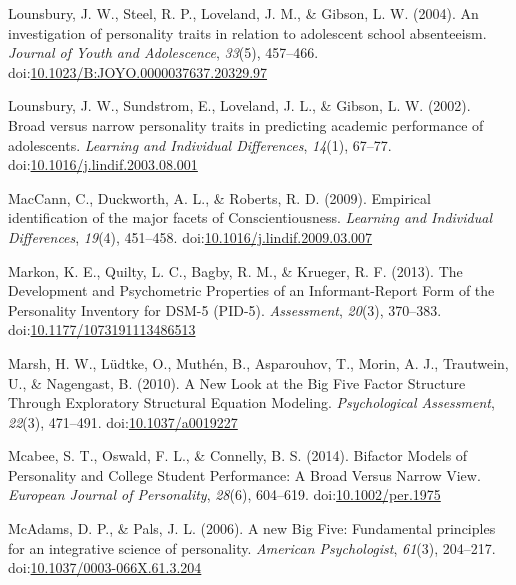 \documentclass[,man,floatsintext]{apa6}
\theoremstyle{definition}
\theoremstyle{definition}
\theoremstyle{definition}
\theoremstyle{remark}
\begin{document}
\leavevmode\hypertarget{ref-Lounsbury2004}{}%
Lounsbury, J. W., Steel, R. P., Loveland, J. M., \& Gibson, L. W.
(2004). An investigation of personality traits in relation to adolescent
school absenteeism. \emph{Journal of Youth and Adolescence},
\emph{33}(5), 457--466.
doi:\href{https://doi.org/10.1023/B:JOYO.0000037637.20329.97}{10.1023/B:JOYO.0000037637.20329.97}

\leavevmode\hypertarget{ref-Lounsbury2002}{}%
Lounsbury, J. W., Sundstrom, E., Loveland, J. L., \& Gibson, L. W.
(2002). Broad versus narrow personality traits in predicting academic
performance of adolescents. \emph{Learning and Individual Differences},
\emph{14}(1), 67--77.
doi:\href{https://doi.org/10.1016/j.lindif.2003.08.001}{10.1016/j.lindif.2003.08.001}

\leavevmode\hypertarget{ref-MacCann2009}{}%
MacCann, C., Duckworth, A. L., \& Roberts, R. D. (2009). Empirical
identification of the major facets of Conscientiousness. \emph{Learning
and Individual Differences}, \emph{19}(4), 451--458.
doi:\href{https://doi.org/10.1016/j.lindif.2009.03.007}{10.1016/j.lindif.2009.03.007}

\leavevmode\hypertarget{ref-Markon2013}{}%
Markon, K. E., Quilty, L. C., Bagby, R. M., \& Krueger, R. F. (2013).
The Development and Psychometric Properties of an Informant-Report Form
of the Personality Inventory for DSM-5 (PID-5). \emph{Assessment},
\emph{20}(3), 370--383.
doi:\href{https://doi.org/10.1177/1073191113486513}{10.1177/1073191113486513}

\leavevmode\hypertarget{ref-Marsh2010}{}%
Marsh, H. W., Lüdtke, O., Muthén, B., Asparouhov, T., Morin, A. J.,
Trautwein, U., \& Nagengast, B. (2010). A New Look at the Big Five
Factor Structure Through Exploratory Structural Equation Modeling.
\emph{Psychological Assessment}, \emph{22}(3), 471--491.
doi:\href{https://doi.org/10.1037/a0019227}{10.1037/a0019227}

\leavevmode\hypertarget{ref-Mcabee2014}{}%
Mcabee, S. T., Oswald, F. L., \& Connelly, B. S. (2014). Bifactor Models
of Personality and College Student Performance: A Broad Versus Narrow
View. \emph{European Journal of Personality}, \emph{28}(6), 604--619.
doi:\href{https://doi.org/10.1002/per.1975}{10.1002/per.1975}

\leavevmode\hypertarget{ref-McAdams2006a}{}%
McAdams, D. P., \& Pals, J. L. (2006). A new Big Five: Fundamental
principles for an integrative science of personality. \emph{American
Psychologist}, \emph{61}(3), 204--217.
doi:\href{https://doi.org/10.1037/0003-066X.61.3.204}{10.1037/0003-066X.61.3.204}
\end{document}
